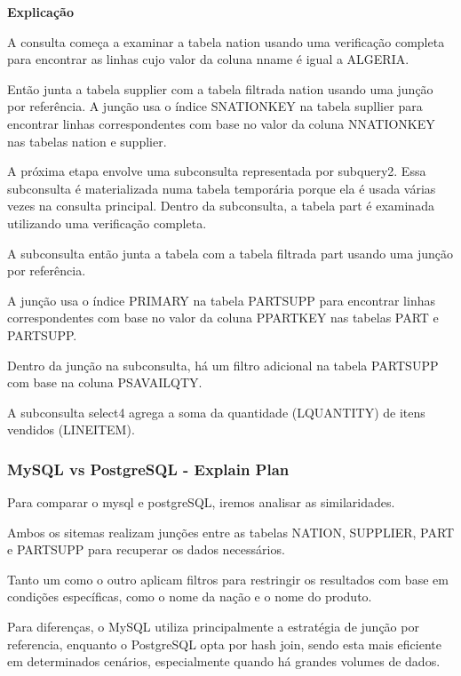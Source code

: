 \documentclass{article}
\begin{document}
\textbf{Explicação}\\
\texttt{}\par A consulta começa a examinar a tabela nation usando uma verificação completa para encontrar as linhas cujo valor da coluna n\underline{}name é igual a ALGERIA.

Então junta a tabela supplier com a tabela filtrada nation usando uma junção por referência. A junção usa o índice S\underline{}NATIONKEY na tabela supllier para encontrar linhas correspondentes com base no valor da coluna N\underline{}NATIONKEY nas tabelas nation e supplier.

A próxima etapa envolve uma subconsulta representada por subquery2. Essa subconsulta é materializada numa tabela temporária porque ela é usada várias vezes na consulta principal. Dentro da subconsulta, a tabela part é examinada utilizando uma verificação completa.

A subconsulta então junta a tabela com a tabela filtrada part usando uma junção por referência.

A junção usa o índice PRIMARY na tabela PARTSUPP para encontrar linhas correspondentes com base no valor da coluna P\underline{}PARTKEY nas tabelas PART e PARTSUPP.

Dentro da junção na subconsulta, há um filtro adicional na tabela PARTSUPP com base na coluna PS\underline{}AVAILQTY.

A subconsulta select4 agrega a soma da quantidade (L\underline{}QUANTITY) de itens vendidos (LINEITEM).

\subsubsection{MySQL vs PostgreSQL - Explain Plan}

\texttt{}\par Para comparar o mysql e postgreSQL, iremos analisar as similaridades.

Ambos os sitemas realizam junções entre as tabelas NATION, SUPPLIER, PART e PARTSUPP para recuperar os dados necessários.

Tanto um como o outro aplicam filtros para restringir os resultados com base em condições específicas, como o nome da nação e o nome do produto.

Para diferenças, o MySQL utiliza principalmente a estratégia de junção por referencia, enquanto o PostgreSQL opta por hash join, sendo esta mais eficiente em determinados cenários, especialmente quando há grandes volumes de dados.
\end{document}
